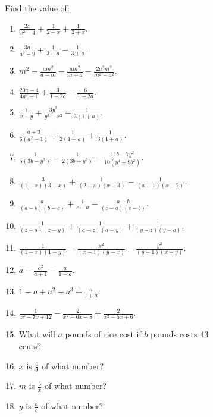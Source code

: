\documentclass{book}
\begin{document}
Find the value of:
\begin{enumerate}
\item $\displaystyle \frac{2x}{x^2-4} + \frac{1}{2-x} +
\frac{1}{2+x}$.

\item $\displaystyle \frac{3a}{a^2-9} + \frac{1}{3-a} -
\frac{1}{3+a}$.

\item $\displaystyle m^2 - \frac{am^2}{a-m} - \frac{am^2}{m+a} -
\frac{2a^2m^2}{m^2-a^2}$.

\item $\displaystyle
\frac{20a-4}{4a^2-1}+\frac{3}{1-2a}-\frac{6}{1-2a}$.

\item $\displaystyle \frac{1}{x-y} + \frac{3y^3}{y^3-x^3} -
\frac{1}{3(1+a)}$.

\item $\displaystyle
\frac{a+3}{6(a^2-1)}+\frac{1}{2(1-a)}+\frac{1}{3(1+a)}$.

\item $\displaystyle
\frac{1}{5(3b-y^2)}-\frac{1}{2(3b+y^2)}-\frac{11b-7y^2}{10(y^4-9b^2)}$.

\item $\displaystyle
\frac{3}{(1-x)(3-x)}+\frac{1}{(2-x)(x-3)}-\frac{1}{(x-1)(x-2)}$.

\item $\displaystyle
\frac{a}{(a-b)(b-c)}+\frac{1}{c-a}-\frac{a-b}{(c-a)(c-b)}$.

\item $\displaystyle
\frac{1}{(z-a)(z-y)}+\frac{1}{(a-z)(a-y)}+\frac{1}{(y-z)(y-a)}$.

\item $\displaystyle
\frac{1}{(1-x)(1-y)}-\frac{x^2}{(x-1)(y-x)}-\frac{y^2}{(y-1)(x-y)}$.

\item $\displaystyle a-\frac{a^2}{a+1}-\frac{a}{1-a}$.

\item $\displaystyle 1-a+a^2-a^3+\frac{a}{1+a}$.

\item $\displaystyle
\frac{1}{x^2-7x+12}-\frac{2}{x^2-6x+8}+\frac{2}{x^2-5x+6}$.

\item What will $a$ pounds of rice cost if $b$ pounds costs 43\\
cents?

\item $x$ is $\frac{4}{9}$ of what number?

\item $m$ is $\frac{5}{x}$ of what number?

\item $y$ is $\frac{a}{b}$ of what number?
\end{enumerate}
\end{document}
